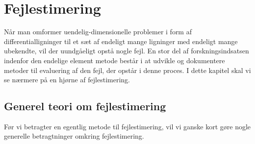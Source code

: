 \chapter{Fejlestimering} \label{fejlestimering}

Når man omformer uendelig-dimensionelle problemer i form af
differentialligninger til et sæt af endeligt mange ligninger med
endeligt mange ubekendte, vil der uundgåeligt opstå nogle fejl. En stor
del af forskningsindsatsen indenfor den endelige element metode består
i at udvikle og dokumentere metoder til evaluering af den fejl, der
opstår i denne proces. I dette kapitel skal vi se nærmere på en hjørne
af fejlestimering.

\section{Generel teori om fejlestimering}
Før vi betragter en egentlig metode til fejlestimering, vil vi ganske
kort gøre nogle generelle betragtninger omkring fejlestimering.

